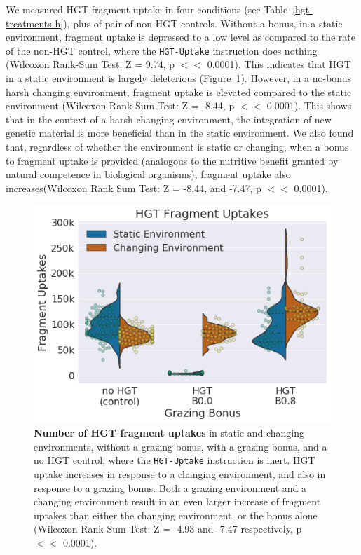 \documentclass[PhD]{msu-thesis}
\begin{document}
We measured HGT fragment uptake in four conditions (see Table~\ref{hgt-treatments-h}), plus of pair of non-HGT controls. Without a bonus, in a static environment, fragment uptake is depressed to a low level as compared to the rate of the non-HGT control, where the \texttt{HGT-Uptake} instruction does nothing (Wilcoxon Rank-Sum Test: Z = 9.74, p $<<$ 0.0001). This indicates that HGT in a static environment is largely deleterious (Figure~\ref{fig:hgt_fragment_uptake}). However, in a no-bonus harsh changing environment, fragment uptake is elevated compared to the static environment (Wilcoxon Rank Sum-Test: Z = -8.44, p $<<$ 0.0001). This shows that in the context of a harsh changing environment, the integration of new genetic material is more beneficial than in the static environment. We also found that, regardless of whether the environment is static or changing, when a bonus to fragment uptake is provided (analogous to the nutritive benefit granted by natural competence in biological organisms), fragment uptake also increases(Wilcoxon Rank Sum Test: Z = -8.44, and -7.47, p $<<$ 0.0001). 

	\begin{figure}[h!]
	\begin{center}
	\includegraphics[width=0.75\columnwidth]{figures/HGT/hgt_fragment_uptake.png}
	\caption{ \textbf{Number of HGT fragment uptakes} in static and changing environments, without a grazing bonus, with a grazing bonus, and a no HGT control, where the \texttt{HGT-Uptake} instruction is inert. HGT uptake increases in response to a changing environment, and also in response to a grazing bonus. Both a grazing environment and a changing environment result in an even larger increase of fragment uptakes than either the changing environment, or the bonus alone (Wilcoxon Rank Sum Test: Z = -4.93 and -7.47 respectively, p $<<$ 0.0001).
	}\label{fig:hgt_fragment_uptake}
	\end{center}
	\end{figure}
\end{document}
